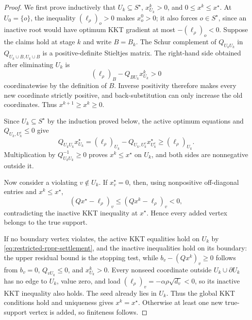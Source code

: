 \begin{proof}
We first prove inductively that $U_k\subseteq S^\star$,
$x^k_{U_k}>0$, and $0\leq x^k\leq x^\star$.  At
$U_0=\{o\}$, the inequality $(\ell_\rho)_o>0$ makes $x_o^0>0$; it also
forces $o\in S^\star$, since an inactive root would have optimum KKT gradient
at most $-(\ell_\rho)_o<0$.  Suppose the claims hold at stage $k$ and
write $B=B_k$.  The Schur complement of $Q_{U_kU_k}$ in
$Q_{U_k\cup B,U_k\cup B}$ is a positive-definite Stieltjes matrix.  The
right-hand side obtained after eliminating $U_k$ is
\[
 (\ell_\rho)_B-Q_{BU_k}x^k_{U_k}>0
\]
coordinatewise by the definition of $B$.  Inverse positivity therefore makes
every new coordinate strictly positive, and back-substitution can only
increase the old coordinates.  Thus $x^{k+1}\geq x^k\geq0$.

Since $U_k\subseteq S^\star$ by the induction proved below, the active optimum
equations and $Q_{U_k,U_k^c}\leq0$ give
\[
 Q_{U_kU_k}x^\star_{U_k}
 =(\ell_\rho)_{U_k}-Q_{U_k,U_k^c}x^\star_{U_k^c}
 \geq(\ell_\rho)_{U_k}.
\]
Multiplication by $Q_{U_kU_k}^{-1}\geq0$ proves
$x^k\leq x^\star$ on $U_k$, and both sides are nonnegative outside it.

Now consider a violating $v\notin U_k$.  If $x_v^\star=0$, then, using
nonpositive off-diagonal entries and $x^k\leq x^\star$,
\[
 (Qx^\star-\ell_\rho)_v
 \leq (Qx^k-\ell_\rho)_v<0,
\]
contradicting the inactive KKT inequality at $x^\star$.  Hence every added
vertex belongs to the true support.

If no boundary vertex violates, the active KKT equalities hold on $U_k$ by
\cref{eq:restricted-rppr-settlement}, and the inactive inequalities hold on
its boundary: the upper residual bound is the stopping test, while
$b_v-(Qx^k)_v\geq0$ follows from $b_v=0$, $Q_{vU_k}\leq0$, and
$x^k_{U_k}>0$.  Every nonseed coordinate outside
$U_k\cup\partial U_k$ has no edge to $U_k$, value zero, and load
$(\ell_\rho)_v=-\alpha\rho\sqrt{d_v}<0$, so its inactive KKT inequality also
holds.  The seed already lies in $U_k$.  Thus the global KKT conditions hold
and uniqueness gives $x^k=x^\star$.  Otherwise at least one new true-support
vertex is added, so finiteness follows.
\end{proof}

